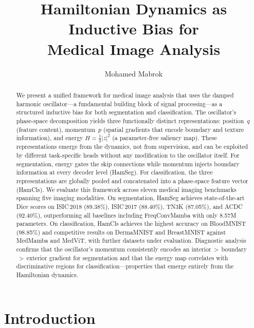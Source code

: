 \documentclass[11pt]{article}
\title{\textbf{Hamiltonian Dynamics as Inductive Bias for\\Medical Image Analysis}}
\author[1]{Mohamed Mabrok}
\affil[1]{Department of Mathematics and Statistics, Qatar University, Doha, Qatar}
\date{}
\begin{document}
\maketitle

\begin{abstract}
We present a unified framework for medical image analysis that uses the damped harmonic oscillator---a fundamental building block of signal processing---as a structured inductive bias for both segmentation and classification. The oscillator's phase-space decomposition yields three functionally distinct representations: position~$q$ (feature content), momentum~$p$ (spatial gradients that encode boundary and texture information), and energy $H = \tfrac{1}{2}|z|^2$ (a parameter-free saliency map). These representations emerge from the dynamics, not from supervision, and can be exploited by different task-specific heads without any modification to the oscillator itself. For segmentation, energy gates the skip connections while momentum injects boundary information at every decoder level (HamSeg). For classification, the three representations are globally pooled and concatenated into a phase-space feature vector (HamCls). We evaluate this framework across eleven medical imaging benchmarks spanning five imaging modalities. On segmentation, HamSeg achieves state-of-the-art Dice scores on ISIC\,2018 (89.38\%), ISIC\,2017 (88.40\%), TN3K (87.05\%), and ACDC (92.40\%), outperforming all baselines including FreqConvMamba with only 8.57M parameters. On classification, HamCls achieves the highest accuracy on BloodMNIST (98.85\%) and competitive results on DermaMNIST and BreastMNIST against MedMamba and MedViT, with further datasets under evaluation. Diagnostic analysis confirms that the oscillator's momentum consistently encodes an interior$\,{>}\,$boundary$\,{>}\,$exterior gradient for segmentation and that the energy map correlates with discriminative regions for classification---properties that emerge entirely from the Hamiltonian dynamics.
\end{abstract}


\section{Introduction}
\label{sec:introduction}
\end{document}
